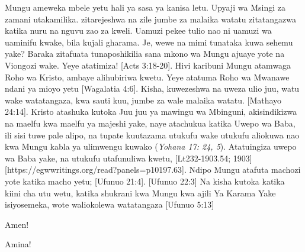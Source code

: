 Mungu ameweka mbele yetu hali ya sasa ya kanisa letu. Upyaji wa Msingi za zamani utakamilika.  zitarejeshwa na zile jumbe za malaika watatu zitatangazwa katika nuru na nguvu zao za kweli. Uamuzi pekee tulio nao ni uamuzi wa uaminifu kwake, bila kujali gharama. Je, wewe na mimi tunataka kuwa sehemu yake? Baraka zitafuata tunaposhikilia sana mkono wa Mungu ajuaye yote na Viongozi wake.  Yeye atatimiza! [Acts 3:18-20]. Hivi karibuni Mungu atamwaga Roho wa Kristo, ambaye alihubiriwa kwetu. Yeye atatuma Roho wa Mwanawe ndani ya mioyo yetu [Wagalatia 4:6]. Kisha, kuwezeshwa na uweza ulio juu, watu wake watatangaza, kwa sauti kuu, jumbe za wale malaika watatu. [Mathayo 24:14]. Kristo atashuka kutoka Juu juu ya mawingu wa Mbinguni, akisindikizwa na maelfu kwa maelfu ya majeshi yake, naye atachukua katika Uwepo wa Baba, ili sisi tuwe pale alipo, na tupate kuutazama utukufu wake utukufu aliokuwa nao kwa Mungu kabla ya ulimwengu kuwako (\textit{Yohana 17: 24, 5}). Atatuingiza uwepo wa Baba yake, na utukufu utafunuliwa kwetu, [Lt232-1903.54; 1903][https://egwwritings.org/read?panels=p10197.63]. Ndipo Mungu atafuta machozi yote katika macho yetu; [Ufunuo 21:4]. [Ufunuo 22:3] Na kisha kutoka katika kiini cha utu wetu, katika shukrani kwa Mungu kwa ajili Ya Karama Yake isiyosemeka, wote waliokolewa  watatangaza [Ufunuo 5:13]


Amen!


Amina!






